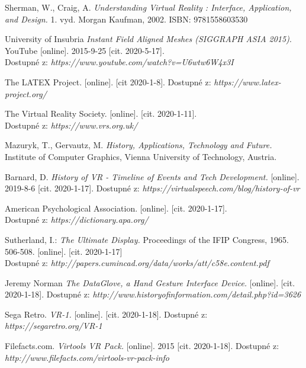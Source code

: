 \documentclass[a4paper, 12pt]{report}
\begin{document}
\renewcommand{\bibname}{Reference}
\begin{thebibliography}{9}


 Sherman, W., Craig, A. \textit{Understanding Virtual Reality : Interface, Application, and Design.} 1. vyd. Morgan Kaufman, 2002. ISBN: 9781558603530

 University of Insubria \textit{Instant Field Aligned Meshes (SIGGRAPH ASIA 2015)}. \\YouTube [online]. 2015-9-25 [cit. 2020-5-17]. \\Dostupné z: \textit{https://www.youtube.com/watch?v=U6wtw6W4x3I}

 The LATEX Project. [online]. [cit 2020-1-8]. Dostupné z: \textit{https://www.latex-project.org/}

 The Virtual Reality Society. [online]. [cit. 2020-1-11]. \\Dostupné z: \textit{https://www.vrs.org.uk/}

 Mazuryk, T., Gervautz, M. \textit{History, Applications, Technology and Future.} Institute of Computer Graphics, Vienna University of Technology, Austria.

 Barnard, D. \textit{History of VR - Timeline of Events and Tech Development.} [online]. 2019-8-6 [cit. 2020-1-17]. Dostupné z: \textit{https://virtualspeech.com/blog/history-of-vr}

 American Psychological Association. [online]. [cit. 2020-1-17]. \\Dostupné z: \textit{https://dictionary.apa.org/}

 Sutherland, I.: \textit{The Ultimate Display.} Proceedings of the IFIP Congress, 1965. 506-508. [online]. [cit. 2020-1-17] \\Dostupné z: \textit{http://papers.cumincad.org/data/works/att/c58e.content.pdf}

  Jeremy Norman \textit{The DataGlove, a Hand Gesture Interface Device.} [online]. [cit. 2020-1-18]. Dostupné z: \textit{http://www.historyofinformation.com/detail.php?id=3626}

 Sega Retro. \textit{VR-1.} [online]. [cit. 2020-1-18]. Dostupné z: \textit{https://segaretro.org/VR-1}

 Filefacts.com. \textit{Virtools VR Pack.} [online]. 2015 [cit. 2020-1-18]. Dostupné z: \textit{http://www.filefacts.com/virtools-vr-pack-info}


\end{thebibliography}
\end{document}
